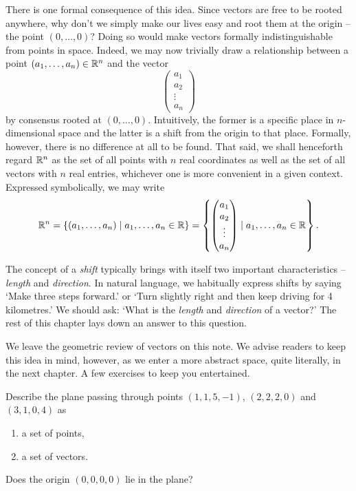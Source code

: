 There is one formal consequence of this idea. Since vectors are free to be
rooted anywhere, why don't we simply make our lives easy and root them at the
origin -- the point $(0,\ldots,0)$? Doing so would make vectors formally
indistinguishable from points in space. Indeed, we may now trivially draw a
relationship between a point $(a_1,\ldots,a_n) \in \mathbb{R}^{n}$ and the vector
\[
 \begin{pmatrix}
  a_1\\
  a_2\\
  \vdots\\
  a_n
 \end{pmatrix}
\]
by consensus rooted at $(0,\ldots,0)$. Intuitively, the former is a specific
place in $n$-dimensional space and the latter is a shift from the origin to that
place. Formally, however, there is no difference at all to be found. That said,
we shall henceforth regard $\mathbb{R}^{n}$ as the set of all points with $n$ real
coordinates as well as the set of all vectors with $n$ real entries, whichever
one is more convenient in a given context. Expressed symbolically, we may write
\[
 \mathbb{R}^{n} = \{(a_1,\ldots,a_n) \mid a_1,\ldots,a_n \in \mathbb{R}\} = \left\{
  \begin{pmatrix}
   a_1\\
   a_2\\
   \vdots\\
   a_n
  \end{pmatrix} \mid a_1,\ldots,a_n \in \mathbb{R}
 \right\}.
\]

The concept of a \emph{shift} typically brings with itself two important
characteristics -- \emph{length} and \emph{direction}. In natural language, we
habitually express shifts by saying `Make three steps forward.' or `Turn
slightly right and then keep driving for 4 kilometres.' We should ask: `What is
the \emph{length} and \emph{direction} of a vector?' The rest of this chapter
lays down an answer to this question.





We leave the geometric review of vectors on this note. We advise readers to keep
this idea in mind, however, as we enter a more abstract space, quite literally,
in the next chapter. A few exercises to keep you entertained.

\begin{exercise}{}{}
 Describe the plane passing through points $(1,1,5,-1)$, $(2,2,2,0)$ and
 $(3,1,0,4)$ as
 \begin{enumerate}[label=(\alph*)]
  \item a set of points,
  \item a set of vectors.
 \end{enumerate}
 Does the origin $(0,0,0,0)$ lie in the plane?
\end{exercise}


